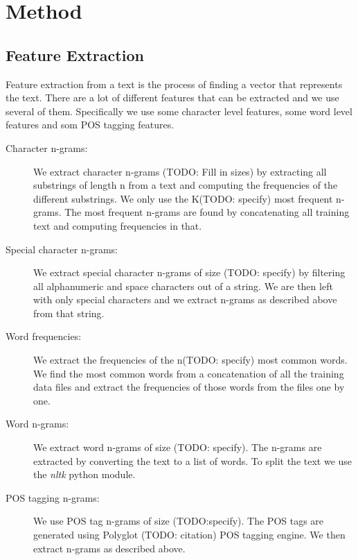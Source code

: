 \section{Method}

\subsection{Feature Extraction}
Feature extraction from a text is the process of finding a vector that
represents the text. There are a lot of different features that can be
extracted and we use several of them. Specifically we use some character
level features, some word level features and som \gls{POS} tagging
features.

\begin{description}

    \item[Character n-grams:] We extract character n-grams (TODO: Fill in sizes)
    by extracting all substrings of length n from a text and computing the
    frequencies of the different substrings. We only use the K(TODO: specify)
    most frequent n-grams. The most frequent n-grams are found by concatenating
    all training text and computing frequencies in that.

    \item[Special character n-grams:] We extract special character n-grams of
    size (TODO: specify) by filtering all alphanumeric and space characters out
    of a string. We are then left with only special characters and we extract
    n-grams as described above from that string.

    \item[Word frequencies:] We extract the frequencies of the n(TODO: specify)
    most common words. We find the most common words from a concatenation of all
    the training data files and extract the frequencies of those words from the
    files one by one.

    \item[Word n-grams:] We extract word n-grams of size (TODO: specify). The
    n-grams are extracted by converting the text to a list of words. To split
    the text we use the \textit{nltk} python module.

    \item[POS tagging n-grams:] We use POS tag n-grams of size (TODO:specify).
    The POS tags are generated using Polyglot (TODO: citation) POS tagging
    engine. We then extract n-grams as described above.

\end{description}

